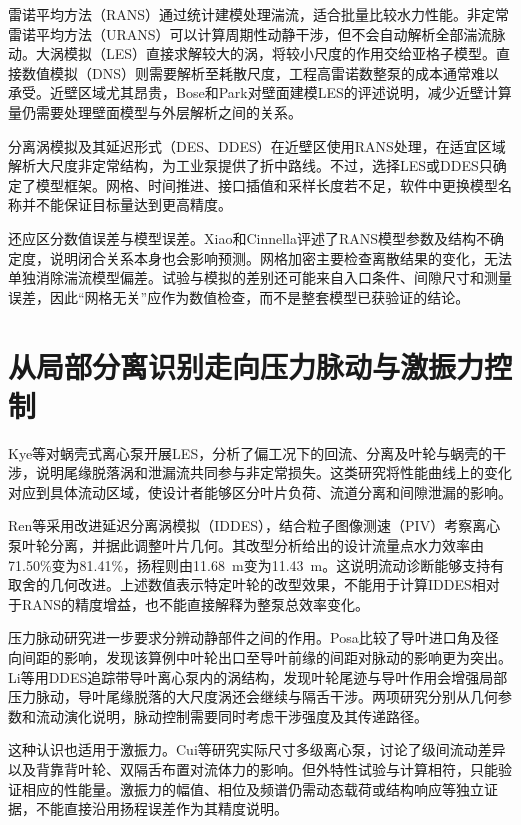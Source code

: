\documentclass[UTF8,a4paper,zihao=-4,fontset=none,oneside]{ctexart}
\begin{document}
雷诺平均方法（RANS）通过统计建模处理湍流，适合批量比较水力性能。非定常雷诺平均方法（URANS）可以计算周期性动静干涉，但不会自动解析全部湍流脉动。大涡模拟（LES）直接求解较大的涡，将较小尺度的作用交给亚格子模型。直接数值模拟（DNS）则需要解析至耗散尺度，工程高雷诺数整泵的成本通常难以承受。近壁区域尤其昂贵，Bose和Park对壁面建模LES的评述说明，减少近壁计算量仍需要处理壁面模型与外层解析之间的关系\cite{Bose2018WMLES}。

分离涡模拟及其延迟形式（DES、DDES）在近壁区使用RANS处理，在适宜区域解析大尺度非定常结构，为工业泵提供了折中路线\cite{Han2024HybridReview}。不过，选择LES或DDES只确定了模型框架。网格、时间推进、接口插值和采样长度若不足，软件中更换模型名称并不能保证目标量达到更高精度。

还应区分数值误差与模型误差。Xiao和Cinnella评述了RANS模型参数及结构不确定度，说明闭合关系本身也会影响预测\cite{Xiao2019Uncertainty}。网格加密主要检查离散结果的变化，无法单独消除湍流模型偏差。试验与模拟的差别还可能来自入口条件、间隙尺寸和测量误差，因此“网格无关”应作为数值检查，而不是整套模型已获验证的结论。

\section{从局部分离识别走向压力脉动与激振力控制}

Kye等对蜗壳式离心泵开展LES，分析了偏工况下的回流、分离及叶轮与蜗壳的干涉，说明尾缘脱落涡和泄漏流共同参与非定常损失\cite{Kye2018VoluteLES}。这类研究将性能曲线上的变化对应到具体流动区域，使设计者能够区分叶片负荷、流道分离和间隙泄漏的影响。

Ren等采用改进延迟分离涡模拟（IDDES），结合粒子图像测速（PIV）考察离心泵叶轮分离，并据此调整叶片几何\cite{Ren2019SeparationIDDES}。其改型分析给出的设计流量点水力效率由71.50\%变为81.41\%，扬程则由11.68~m变为11.43~m。这说明流动诊断能够支持有取舍的几何改进。上述数值表示特定叶轮的改型效果，不能用于计算IDDES相对于RANS的精度增益，也不能直接解释为整泵总效率变化。

压力脉动研究进一步要求分辨动静部件之间的作用。Posa比较了导叶进口角及径向间距的影响，发现该算例中叶轮出口至导叶前缘的间距对脉动的影响更为突出\cite{Posa2021DiffuserAngle}。Li等用DDES追踪带导叶离心泵内的涡结构，发现叶轮尾迹与导叶作用会增强局部压力脉动，导叶尾缘脱落的大尺度涡还会继续与隔舌干涉\cite{Li2022VorticalDDES}。两项研究分别从几何参数和流动演化说明，脉动控制需要同时考虑干涉强度及其传递路径。

这种认识也适用于激振力。Cui等研究实际尺寸多级离心泵，讨论了级间流动差异以及背靠背叶轮、双隔舌布置对流体力的影响\cite{Cui2022ExcitingForces}。但外特性试验与计算相符，只能验证相应的性能量。激振力的幅值、相位及频谱仍需动态载荷或结构响应等独立证据，不能直接沿用扬程误差作为其精度说明。
\end{document}
